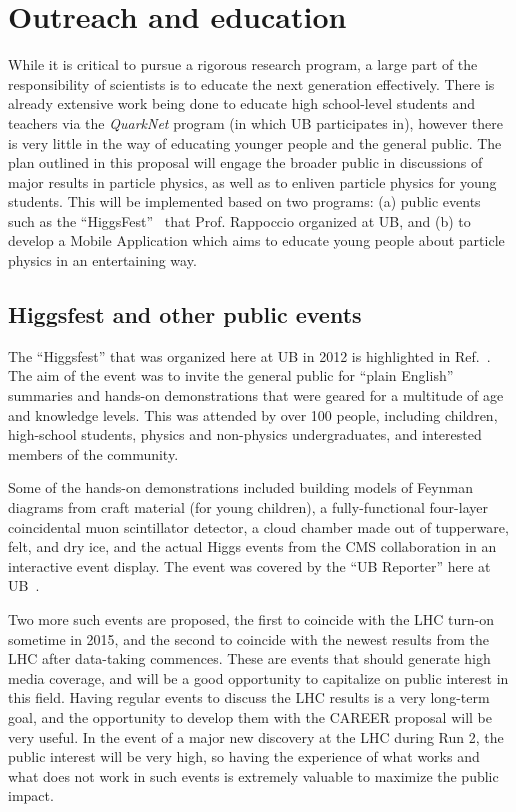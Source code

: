 \documentclass[12pt]{proposalnsf}
\begin{document}
\clearpage
\section{Outreach and education}
\label{sec:outreach}


While it is critical to pursue a rigorous research program, a large
part of the responsibility of scientists is to educate the next
generation effectively. There is already extensive work being done to
educate high school-level students and teachers via the {\em QuarkNet}
program (in which UB participates in), however there is
very little in the way of educating younger people and the general
public. 
The plan outlined in this proposal will engage the broader
public in discussions of major results in particle
physics, as well as to enliven particle physics for young students. 
This will be implemented based on two programs: (a) public events such
as the ``HiggsFest''~\cite{higgsfest} that Prof. Rappoccio organized at UB,
and (b) to develop a Mobile Application which aims to educate
young people about particle physics in an entertaining way. 


\subsection{Higgsfest and other public events}

The ``Higgsfest'' that was organized here at UB in 2012
is highlighted in Ref.~\cite{higgsfest}. The aim of the event was to
invite the general public for ``plain English'' summaries and hands-on
demonstrations that were geared for a multitude of age and knowledge
levels. 
This was attended by over 100 people, including children,
high-school students, physics and non-physics undergraduates, and
interested members of the community. 

Some of the hands-on demonstrations included building models of
Feynman diagrams from craft material (for young children), a
fully-functional four-layer coincidental muon scintillator detector,
a cloud chamber made out of tupperware, felt, and dry ice, and the
actual Higgs events from the CMS collaboration in an interactive event
display. 
The event was covered by the ``UB Reporter'' here at
UB~\cite{higgsfest_ubreporter}. 

Two more such events are proposed, the first to coincide with the LHC
turn-on sometime in 2015, and the second to coincide with the newest
results from the LHC after data-taking commences. These are 
events that should generate high media coverage, and will be a good
opportunity to capitalize on public interest in this field. Having
regular events to discuss the LHC results is a very long-term goal,
and the opportunity to develop them with the CAREER proposal
will be very useful. In the event of a major new discovery at the LHC
during Run 2, the public interest will be very high, so having the
experience of what works and what does not work in such events is
extremely valuable to maximize the public impact. 
\end{document}

